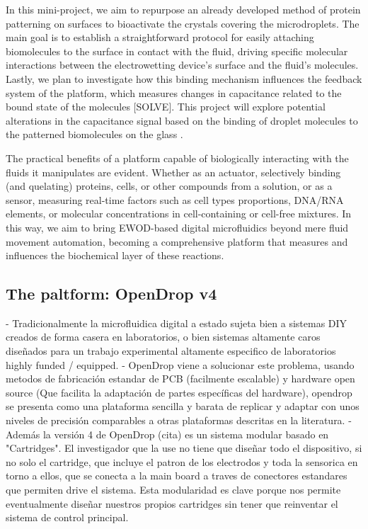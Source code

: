 \documentclass[10pt, twocolumn]{article}
\begin{document}
In this mini-project, we aim to repurpose an already developed method of protein patterning on surfaces to bioactivate the crystals covering the microdroplets\cite{straleMultiproteinPrintingLightInduced2016}. The main goal is to establish a straightforward protocol for easily attaching biomolecules to the surface in contact with the fluid, driving specific molecular interactions between the electrowetting device's surface and the fluid's molecules. Lastly, we plan to investigate how this binding mechanism influences the feedback system of the platform, which measures changes in capacitance related to the bound state of the molecules [SOLVE]. This project will explore potential alterations in the capacitance signal based on the binding of droplet molecules to the patterned biomolecules on the glass \cite{wangUltraSensitiveCapacitiveMicrowire2019}.

The practical benefits of a platform capable of biologically interacting with the fluids it manipulates are evident. Whether as an actuator, selectively binding (and quelating) proteins, cells, or other compounds from a solution, or as a sensor, measuring real-time factors such as cell types proportions, DNA/RNA elements, or molecular concentrations in cell-containing or cell-free mixtures. In this way, we aim to bring EWOD-based digital microfluidics beyond mere fluid movement automation, becoming a comprehensive platform that measures and influences the biochemical layer of these reactions.


\subsection*{The paltform: OpenDrop v4}
- Tradicionalmente la microfluidica digital a estado sujeta bien a sistemas DIY creados de forma casera en laboratorios, o bien sistemas altamente caros diseñados para un trabajo experimental altamente especifico de laboratorios highly funded / equipped. 
- OpenDrop viene a solucionar este problema, usando metodos de fabricación estandar de PCB (facilmente escalable) y hardware open source (Que facilita la adaptación de partes específicas del hardware), opendrop se presenta como una plataforma sencilla y barata de replicar y adaptar con unos niveles de precisión comparables a otras plataformas descritas en la literatura.
- Además la versión 4 de OpenDrop (cita) es un sistema modular basado en "Cartridges". El investigador que la use no tiene que diseñar todo el dispositivo, si no solo el cartridge, que incluye el patron de los electrodos y toda la sensorica en torno a ellos, que se conecta a la main board a traves de conectores estandares que permiten drive el sistema. Esta modularidad es clave porque nos permite eventualmente diseñar nuestros propios cartridges sin tener que reinventar el sistema de control principal.
\end{document}
